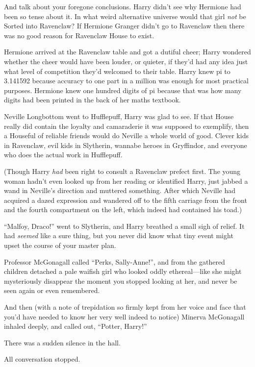 And talk about your foregone conclusions. Harry didn’t see why Hermione had been so tense about it. In what weird alternative universe would that girl \emph{not} be Sorted into Ravenclaw? If Hermione Granger didn’t go to Ravenclaw then there was no good reason for Ravenclaw House to exist.

Hermione arrived at the Ravenclaw table and got a dutiful cheer; Harry wondered whether the cheer would have been louder, or quieter, if they’d had any idea just what level of competition they’d welcomed to their table. Harry knew pi to 3.141592 because accuracy to one part in a million was enough for most practical purposes. Hermione knew one hundred digits of pi because that was how many digits had been printed in the back of her maths textbook.

Neville Longbottom went to Hufflepuff, Harry was glad to see. If that House really did contain the loyalty and camaraderie it was supposed to exemplify, then a Houseful of reliable friends would do Neville a whole world of good. Clever kids in Ravenclaw, evil kids in Slytherin, wannabe heroes in Gryffindor, and everyone who does the actual work in Hufflepuff.

(Though Harry \emph{had} been right to consult a Ravenclaw prefect first. The young woman hadn’t even looked up from her reading or identified Harry, just jabbed a wand in Neville’s direction and muttered something. After which Neville had acquired a dazed expression and wandered off to the fifth carriage from the front and the fourth compartment on the left, which indeed had contained his toad.)

“Malfoy, Draco!” went to Slytherin, and Harry breathed a small sigh of relief. It had \emph{seemed} like a sure thing, but you never did know what tiny event might upset the course of your master plan.

Professor McGonagall called “Perks, Sally-Anne!”, and from the gathered children detached a pale waifish girl who looked oddly ethereal—like she might mysteriously disappear the moment you stopped looking at her, and never be seen again or even remembered.

And then (with a note of trepidation so firmly kept from her voice and face that you’d have needed to know her very well indeed to notice) Minerva McGonagall inhaled deeply, and called out, “Potter, Harry!”

There was a sudden silence in the hall.

All conversation stopped.

